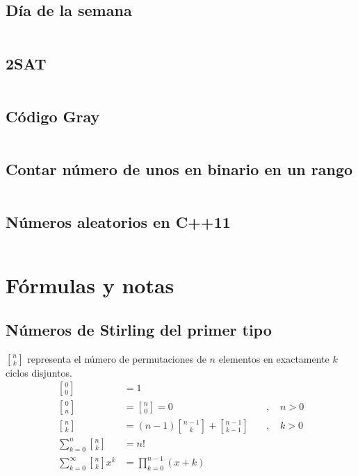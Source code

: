 \documentclass[11pt]{article}
\newcommand{\genstirlingI}[3]{%
	\genfrac{[}{]}{0pt}{#1}{#2}{#3}%
}
\newcommand{\stirlingI}[2]{\genstirlingI{}{#1}{#2}}
\begin{document}
		\subsection{Día de la semana}
		\inputminted[tabsize=2,breaklines,firstline=35,lastline=44,fontsize=\small]{c++}{misc.cpp}
		
		\subsection{2SAT}
		\inputminted[tabsize=2,breaklines,firstline=85,lastline=128,fontsize=\small]{c++}{misc.cpp}
		
		\subsection{Código Gray}
		\inputminted[tabsize=2,breaklines,firstline=130,lastline=143,fontsize=\small]{c++}{misc.cpp}
		
		\subsection{Contar número de unos en binario en un rango}
		\inputminted[tabsize=2,breaklines,firstline=158,lastline=165,fontsize=\small]{c++}{misc.cpp}
		
		\subsection{Números aleatorios en C++11}
		\inputminted[tabsize=2,breaklines,firstline=167,lastline=180,fontsize=\small]{c++}{misc.cpp}
		
	\newpage
	\section{Fórmulas y notas}
		\subsection{Números de Stirling del primer tipo}
			$\stirlingI{n}{k}$ representa el número de permutaciones de $n$ elementos en exactamente $k$ ciclos disjuntos.
			\begin{align*}
				\stirlingI{0}{0} &= 1 \\
				\stirlingI{0}{n} &= \stirlingI{n}{0} = 0 \quad &, \quad n>0 \\
				\stirlingI{n}{k} &= (n-1)\stirlingI{n-1}{k} + \stirlingI{n-1}{k-1} \quad &, \quad k>0 \\
				\sum_{k=0}^{n} \stirlingI{n}{k} &= n! \\
				\sum_{k=0}^{\infty} \stirlingI{n}{k} x^k &= \prod_{k=0}^{n-1}(x+k)
			\end{align*}
		
\end{document}
